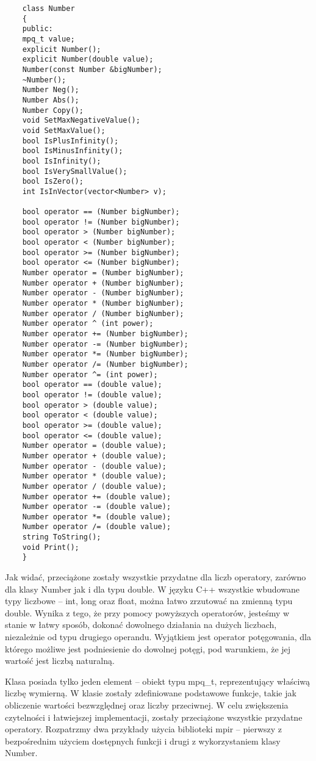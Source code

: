 \documentclass[oneside,a4paper]{book}
\begin{document}
	\begin{lstlisting}
	class Number
	{
	public:
	mpq_t value;
	explicit Number();
	explicit Number(double value);
	Number(const Number &bigNumber);
	~Number();
	Number Neg();
	Number Abs();
	Number Copy();
	void SetMaxNegativeValue();
	void SetMaxValue();
	bool IsPlusInfinity();
	bool IsMinusInfinity();
	bool IsInfinity();
	bool IsVerySmallValue();
	bool IsZero();
	int IsInVector(vector<Number> v);
	
	bool operator == (Number bigNumber);
	bool operator != (Number bigNumber);
	bool operator > (Number bigNumber);
	bool operator < (Number bigNumber);
	bool operator >= (Number bigNumber);
	bool operator <= (Number bigNumber);
	Number operator = (Number bigNumber);
	Number operator + (Number bigNumber);
	Number operator - (Number bigNumber);
	Number operator * (Number bigNumber);
	Number operator / (Number bigNumber);
	Number operator ^ (int power);
	Number operator += (Number bigNumber);
	Number operator -= (Number bigNumber);
	Number operator *= (Number bigNumber);
	Number operator /= (Number bigNumber);
	Number operator ^= (int power);
	bool operator == (double value);
	bool operator != (double value);
	bool operator > (double value);
	bool operator < (double value);
	bool operator >= (double value);
	bool operator <= (double value);
	Number operator = (double value);
	Number operator + (double value);
	Number operator - (double value);
	Number operator * (double value);
	Number operator / (double value);
	Number operator += (double value);
	Number operator -= (double value);
	Number operator *= (double value);
	Number operator /= (double value);
	string ToString();
	void Print();
	}
	\end{lstlisting}
	
	Jak widać, przeciążone zostały wszystkie przydatne dla liczb operatory, zarówno dla klasy Number jak i dla typu double. W języku C++ wszystkie wbudowane typy liczbowe -- int, long oraz float, można łatwo zrzutować na zmienną typu double. Wynika z tego, że przy pomocy powyższych operatorów, jesteśmy w stanie w łatwy sposób, dokonać dowolnego działania na dużych liczbach, niezależnie od typu drugiego operandu. Wyjątkiem jest operator potęgowania, dla którego możliwe jest podniesienie do dowolnej potęgi, pod warunkiem, że jej wartość jest liczbą naturalną.
	
	Klasa posiada tylko jeden element – obiekt typu mpq\_t, reprezentujący właściwą liczbę wymierną. W klasie zostały zdefiniowane podstawowe funkcje, takie jak obliczenie wartości bezwzględnej oraz liczby przeciwnej. W celu zwiększenia czytelności i łatwiejszej implementacji, zostały przeciążone wszystkie przydatne operatory. Rozpatrzmy dwa przykłady użycia biblioteki mpir – pierwszy z bezpośrednim użyciem dostępnych funkcji i drugi z wykorzystaniem klasy Number.
	
\end{document}
